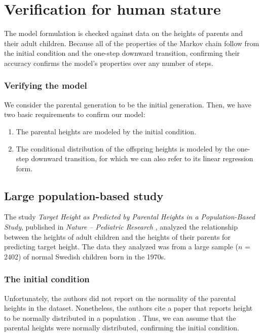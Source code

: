 \documentclass[letterpaper,10pt]{article} %
\begin{document}
\section{Verification for human stature}

The model formulation is checked against data on the heights of parents and their adult children. Because all of the properties of the Markov chain follow from the initial condition and the one-step downward transition, confirming their accuracy confirms the model's properties over any number of steps.

\subsubsection*{Verifying the model}
We consider the parental generation to be the initial generation. Then, we have two basic requirements to confirm our model:
\begin{enumerate}
\item The parental heights are modeled by the initial condition.
\item The conditional distribution of the offspring heights is modeled by the one-step downward transition, for which we can also refer to its linear regression form.
\end{enumerate}



\subsection{Large population-based study}

The study \emph{Target Height as Predicted by Parental Heights in a Population-Based Study}, published in \emph{Nature -- Pediatric Research} \cite{luo}, analyzed the relationship between the heights of adult children and the heights of their parents for predicting target height. The data they analyzed was from a large sample ($n$ = 2402) of normal Swedish children born in the 1970s. 


\subsubsection*{The initial condition}
Unfortunately, the authors did not report on the normality of the parental heights in the dataset. Nonetheless, the authors cite a paper that reports height to be normally distributed in a population \cite{preece}. Thus, we can assume that the parental heights were normally distributed, confirming the initial condition.
\end{document}
